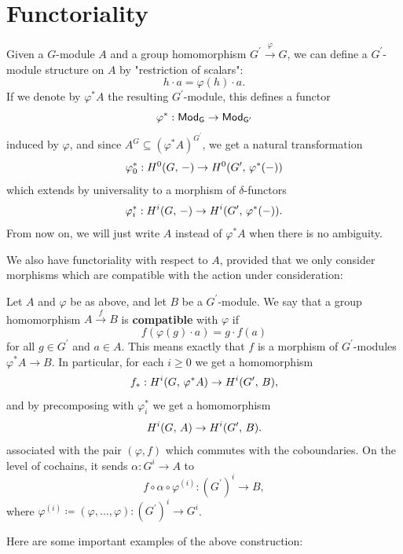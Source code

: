 \documentclass[a4paper, oneside]{memoir}
\begin{document}
\section{Functoriality}

Given a $G$-module $A$ and a group homomorphism $ G^{\prime} \overset{\varphi}{\to} G$, we can define a $G^{\prime} $-module structure on $A$ by "restriction of scalars":
\[
	h\cdot a = \varphi(h)\cdot a.
\]
If we denote by $\varphi^* A$ the resulting $G^{\prime} $-module, this defines a functor
\[
	\varphi^* : \mathsf{Mod}_\mathsf{G}\to \mathsf{Mod}_\mathsf{G^\prime}
\]
induced by $\varphi$, and since $A^G\subseteq (\varphi^*A)^{G^{\prime}} $, we get a natural transformation
\[
	\varphi_0^*: H^{0}( G, \, - )\to H^{0}( G^{\prime} , \, \varphi^*(-) )
\]
which extends by universality to a morphism of $\delta$-functors
\[
	\varphi_i^*: H^{i}( G, \, - )\to H^{i}( G^{\prime} , \, \varphi^*(-) )
	.\]
From now on, we will just write $A$ instead of $\varphi^*A$ when there is no ambiguity.

We also have functoriality with respect to $A$, provided that we only consider morphisms which are compatible with the action under consideration:

\begin{definition}
	Let $A$ and $\varphi$ be as above, and let $B$ be a $G^{\prime} $-module. We say that a group homomorphism $A\overset{f}{\to} B$ is \textbf{compatible} with $\varphi$ if
	\[
		f(\varphi(g)\cdot a)=g\cdot f(a)
	\]
	for all $g\in G^{\prime} $ and $a\in A$. This means exactly that $f$ is a morphism of $G^{\prime} $-modules $\varphi^*A\to B$. In particular, for each $i\geq 0$ we get a homomorphism
	\[
		f_*: H^{i}( G, \, \varphi^*A )\to H^{i}( G^{\prime} , \, B ),
	\]
	and by precomposing with $\varphi_i^*$ we get a homomorphism
	\[
		H^{i}( G, \, A )\to H^{i}( G^{\prime} , \, B ).
	\]
	associated with the pair $(\varphi,f)$ which commutes with the coboundaries.
	On the level of cochains, it sends $\alpha: G^i\to A$ to
	\begin{equation*}\label{eq:Explicit} f \circ \alpha \circ \varphi^{(i)}: {(G^{\prime})}^i\to B, \end{equation*}
	where \(\varphi^{(i)} \coloneqq (\varphi, \dots ,\varphi): {(G^{\prime})}^i\to G^i \).
\end{definition}

Here are some important examples of the above construction:
\end{document}
